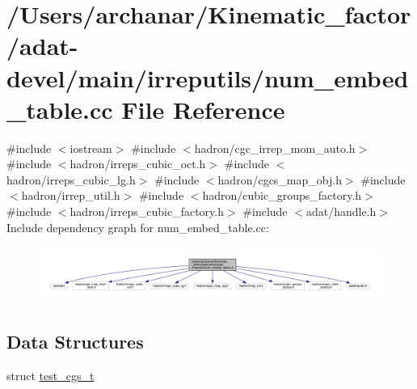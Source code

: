 \hypertarget{adat-devel_2main_2irreputils_2num__embed__table_8cc}{}\section{/\+Users/archanar/\+Kinematic\+\_\+factor/adat-\/devel/main/irreputils/num\+\_\+embed\+\_\+table.cc File Reference}
\label{adat-devel_2main_2irreputils_2num__embed__table_8cc}
{\ttfamily \#include $<$iostream$>$}\newline
{\ttfamily \#include $<$hadron/cgc\+\_\+irrep\+\_\+mom\+\_\+auto.\+h$>$}\newline
{\ttfamily \#include $<$hadron/irreps\+\_\+cubic\+\_\+oct.\+h$>$}\newline
{\ttfamily \#include $<$hadron/irreps\+\_\+cubic\+\_\+lg.\+h$>$}\newline
{\ttfamily \#include $<$hadron/cgcs\+\_\+map\+\_\+obj.\+h$>$}\newline
{\ttfamily \#include $<$hadron/irrep\+\_\+util.\+h$>$}\newline
{\ttfamily \#include $<$hadron/cubic\+\_\+groups\+\_\+factory.\+h$>$}\newline
{\ttfamily \#include $<$hadron/irreps\+\_\+cubic\+\_\+factory.\+h$>$}\newline
{\ttfamily \#include $<$adat/handle.\+h$>$}\newline
Include dependency graph for num\+\_\+embed\+\_\+table.\+cc\+:
\nopagebreak
\begin{figure}[H]
\begin{center}
\leavevmode
\includegraphics[width=350pt]{df/d65/adat-devel_2main_2irreputils_2num__embed__table_8cc__incl}
\end{center}
\end{figure}
\subsection*{Data Structures}
\begin{DoxyCompactItemize}
\item 
struct \mbox{\hyperlink{structtest__cgs__t}{test\+\_\+cgs\+\_\+t}}
\end{DoxyCompactItemize}
